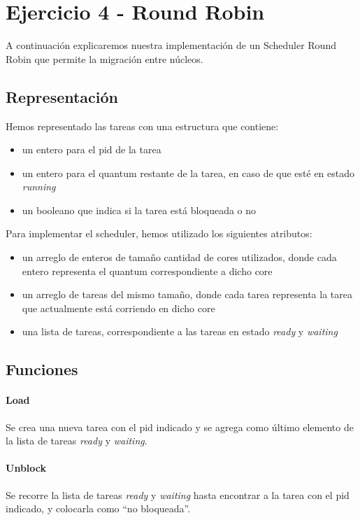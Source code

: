 \section{Ejercicio 4 - Round Robin}

A continuación explicaremos nuestra implementación de un Scheduler Round Robin que permite la migración entre núcleos.

\subsection{Representación}

Hemos representado las tareas con una estructura que contiene:

\begin{itemize}
\item un entero para el pid de la tarea
\item un entero para el quantum restante de la tarea, en caso de que esté en estado {\it running}
\item un booleano que indica si la tarea está bloqueada o no
\end{itemize}

Para implementar el scheduler, hemos utilizado los siguientes atributos:

\begin{itemize}
\item un arreglo de enteros de tamaño cantidad de cores utilizados, donde cada entero representa el quantum correspondiente a dicho core
\item un arreglo de tareas del mismo tamaño, donde cada tarea representa la tarea que actualmente está corriendo en dicho core
\item una lista de tareas, correspondiente a las tareas en estado {\it ready} y {\it waiting}
\end{itemize}

\subsection{Funciones}

\paragraph{Load} Se crea una nueva tarea con el pid indicado y se agrega como último elemento de la lista de tareas {\it ready} y {\it waiting}.

\paragraph{Unblock} Se recorre la lista de tareas {\it ready} y {\it waiting} hasta encontrar a la tarea con el pid indicado, y colocarla como ``no bloqueada''.

